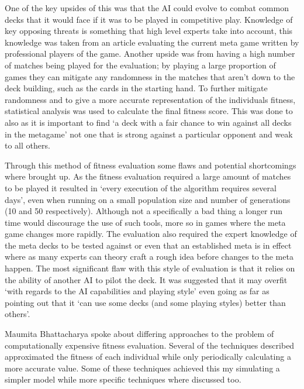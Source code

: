 \documentclass[a4paper]{article}
\begin{document}
\par
One of the key upsides of this was that the AI could evolve to combat common decks that it would face if it was to be played in competitive play.
Knowledge of key opposing threats is something that high level experts take into account, this knowledge was taken from an article evaluating the current meta game written by professional players of the game.
Another upside was from having a high number of matches being played for the evaluation; by playing a large proportion of games they can mitigate any randomness in the matches that aren't down to the deck building, such as the cards in the starting hand.
To further mitigate randomness and to give a more accurate representation of the individuals fitness, statistical analysis was used to calculate the final fitness score.
This was done to also as it is important to find `a deck with a fair chance to win against all decks in the metagame' not one that is strong against a particular opponent and weak to all others.
\par
Through this method of fitness evaluation some flaws and potential shortcomings where brought up.
As the fitness evaluation required a large amount of matches to be played it resulted in `every execution of the algorithm requires several days', even when running on a small population size and number of generations (10 and 50 respectively).
Although not a specifically a bad thing a longer run time would discourage the use of such tools, more so in games where the meta game changes more rapidly.
The evaluation also required the expert knowledge of the meta decks to be tested against or even that an established meta is in effect where as many experts can theory craft a rough idea before changes to the meta happen.
The most significant flaw with this style of evaluation is that it relies on the ability of another AI to pilot the deck.
It was suggested that it may overfit `with regards to the AI capabilities and playing style' even going as far as pointing out that it `can use some decks (and some playing styles) better than others'.
\\ \par
Maumita Bhattacharya spoke about differing approaches to the problem of computationally expensive fitness evaluation\cite{expensiveOptimisation}.
Several of the techniques described approximated the fitness of each individual while only periodically calculating a more accurate value.
Some of these techniques achieved this my simulating a simpler model while more specific techniques where discussed too.
\end{document}
